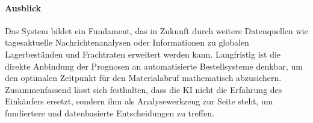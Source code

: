\paragraph{Ausblick}
Das System bildet ein Fundament, das in Zukunft durch weitere Datenquellen wie tagesaktuelle Nachrichtenanalysen oder Informationen zu globalen Lagerbeständen und Frachtraten erweitert werden kann. Langfristig ist die direkte Anbindung der Prognosen an automatisierte Bestellsysteme denkbar, um den optimalen Zeitpunkt für den Materialabruf mathematisch abzusichern. Zusammenfassend lässt sich festhalten, dass die KI nicht die Erfahrung des Einkäufers ersetzt, sondern ihm als Analysewerkzeug zur Seite steht, um fundiertere und datenbasierte Entscheidungen zu treffen.
